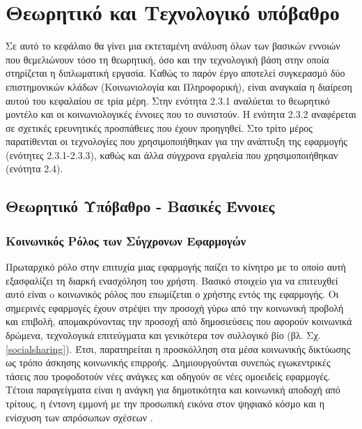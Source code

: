 \chapter{Θεωρητικό και Τεχνολογικό υπόβαθρο}
\label{chap3}

Σε αυτό το κεφάλαιο θα γίνει μια εκτεταμένη ανάλυση όλων των βασικών εννοιών που θεμελιώνουν τόσο τη θεωρητική, όσο και την τεχνολογική βάση στην οποία στηρίζεται η διπλωματική εργασία. Καθώς το παρόν έργο αποτελεί συγκερασμό δύο επιστημονικών κλάδων (Κοινωνιολογία και Πληροφορική), είναι αναγκαία η διαίρεση αυτού του κεφαλαίου σε τρία μέρη. Στην ενότητα 2.3.1 αναλύεται το θεωρητικό μοντέλο και οι κοινωνιολογικές έννοιες που το συνιστούν. Η ενότητα 2.3.2 αναφέρεται σε σχετικές ερευνητικές προσπάθειες που έχουν προηγηθεί. Στο τρίτο μέρος παρατίθενται οι τεχνολογίες που χρησιμοποιήθηκαν για την ανάπτυξη της εφαρμογής (ενότητες 2.3.1-2.3.3), καθώς και άλλα σύγχρονα εργαλεία που χρησιμοποιήθηκαν (ενότητα 2.4).

\section{Θεωρητικό Υπόβαθρο - Βασικές Έννοιες}

\subsection{Κοινωνικός Ρόλος των Σύγχρονων Εφαρμογών}
Πρωταρχικό ρόλο στην επιτυχία μιας εφαρμογής παίζει το κίνητρο με το οποίο αυτή εξασφαλίζει τη διαρκή ενασχόληση του χρήστη. Βασικό στοιχείο για να επιτευχθεί αυτό είναι o κοινωνικός ρόλος που επωμίζεται ο χρήστης εντός της εφαρμογής. Oι σημερινές εφαρμογές έχουν στρέψει την προσοχή γύρω από την κοινωνική προβολή και επιβολή, απομακρύνοντας την προσοχή από δημοσιεύσεις που αφορούν κοινωνικά δρώμενα, τεχνολογικά επιτεύγματα και γενικότερα τον συλλογικό βίο (βλ. Σχ. \ref{socialsharing}). Έτσι, παρατηρείται η προσκόλληση στα μέσα κοινωνικής δικτύωσης ως τρόπο άσκησης κοινωνικής επιρροής. Δημιουργούνται συνεπώς εγωκεντρικές τάσεις που τροφοδοτούν νέες ανάγκες και οδηγούν σε νέες ομοειδείς εφαρμογές. Τέτοια παραγείγματα είναι η ανάγκη για δημοτικότητα και κοινωνική αποδοχή \cite{[IND+16]} από τρίτους, η έντονη εμμονή με την προσωπική εικόνα στον ψηφιακό κόσμο και η ενίσχυση των απρόσωπων σχέσεων \cite{[JAR+18]}. 

